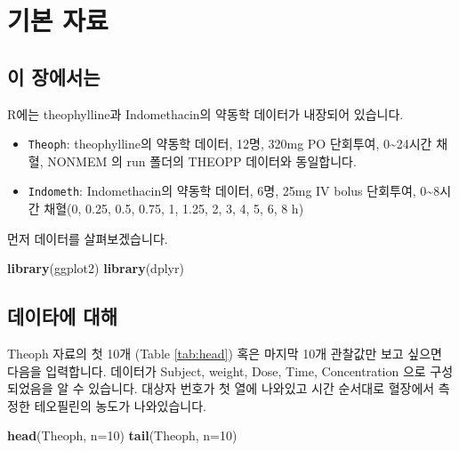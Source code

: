 \documentclass[
  12pt,
]{krantz}
\newenvironment{Shaded}{\begin{snugshade}}{\end{snugshade}}
\newcommand{\DataTypeTok}[1]{\textcolor[rgb]{0.13,0.29,0.53}{#1}}
\newcommand{\DecValTok}[1]{\textcolor[rgb]{0.00,0.00,0.81}{#1}}
\newcommand{\KeywordTok}[1]{\textcolor[rgb]{0.13,0.29,0.53}{\textbf{#1}}}
\newcommand{\NormalTok}[1]{#1}
\providecommand{\tightlist}{%
  \setlength{\itemsep}{0pt}\setlength{\parskip}{0pt}}
\begin{document}
\hypertarget{datasets}{%
\chapter{기본 자료}\label{datasets}}

\hypertarget{introdatasets}{%
\section{이 장에서는}\label{introdatasets}}

R에는 theophylline과 Indomethacin의 약동학 데이터가 내장되어 있습니다.

\begin{itemize}
\tightlist
\item
  \texttt{Theoph}: theophylline의 약동학 데이터, 12명, 320mg PO 단회투여, 0\textasciitilde24시간 채혈, NONMEM 의 run 폴더의 THEOPP 데이터와 동일합니다.
\item
  \texttt{Indometh}: Indomethacin의 약동학 데이터, 6명, 25mg IV bolus 단회투여, 0\textasciitilde8시간 채혈(0, 0.25, 0.5, 0.75, 1, 1.25, 2, 3, 4, 5, 6, 8 h)
\end{itemize}

먼저 데이터를 살펴보겠습니다.

\begin{Shaded}
\begin{Highlighting}[]
\KeywordTok{library}\NormalTok{(ggplot2)}
\KeywordTok{library}\NormalTok{(dplyr)}
\end{Highlighting}
\end{Shaded}

\hypertarget{TheophData}{%
\section{데이타에 대해}\label{TheophData}}

Theoph 자료의 첫 10개 (Table \ref{tab:head}) 혹은 마지막 10개 관찰값만 보고 싶으면 다음을 입력합니다.
데이터가 Subject, weight, Dose, Time, Concentration 으로 구성되었음을 알 수 있습니다. 대상자 번호가 첫 열에 나와있고 시간 순서대로 혈장에서 측정한 테오필린의 농도가 나와있습니다.

\begin{Shaded}
\begin{Highlighting}[]
\KeywordTok{head}\NormalTok{(Theoph, }\DataTypeTok{n=}\DecValTok{10}\NormalTok{)}
\KeywordTok{tail}\NormalTok{(Theoph, }\DataTypeTok{n=}\DecValTok{10}\NormalTok{)}
\end{Highlighting}
\end{Shaded}
\end{document}
